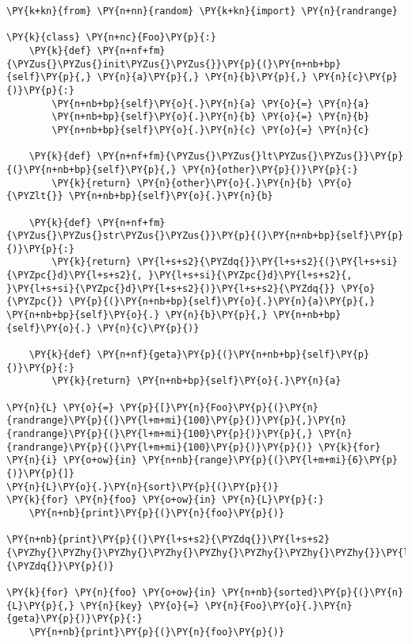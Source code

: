 \begin{Verbatim}[commandchars=\\\{\}]
\PY{k+kn}{from} \PY{n+nn}{random} \PY{k+kn}{import} \PY{n}{randrange}

\PY{k}{class} \PY{n+nc}{Foo}\PY{p}{:}
    \PY{k}{def} \PY{n+nf+fm}{\PYZus{}\PYZus{}init\PYZus{}\PYZus{}}\PY{p}{(}\PY{n+nb+bp}{self}\PY{p}{,} \PY{n}{a}\PY{p}{,} \PY{n}{b}\PY{p}{,} \PY{n}{c}\PY{p}{)}\PY{p}{:}
        \PY{n+nb+bp}{self}\PY{o}{.}\PY{n}{a} \PY{o}{=} \PY{n}{a}
        \PY{n+nb+bp}{self}\PY{o}{.}\PY{n}{b} \PY{o}{=} \PY{n}{b}
        \PY{n+nb+bp}{self}\PY{o}{.}\PY{n}{c} \PY{o}{=} \PY{n}{c}

    \PY{k}{def} \PY{n+nf+fm}{\PYZus{}\PYZus{}lt\PYZus{}\PYZus{}}\PY{p}{(}\PY{n+nb+bp}{self}\PY{p}{,} \PY{n}{other}\PY{p}{)}\PY{p}{:}
        \PY{k}{return} \PY{n}{other}\PY{o}{.}\PY{n}{b} \PY{o}{\PYZlt{}} \PY{n+nb+bp}{self}\PY{o}{.}\PY{n}{b}

    \PY{k}{def} \PY{n+nf+fm}{\PYZus{}\PYZus{}str\PYZus{}\PYZus{}}\PY{p}{(}\PY{n+nb+bp}{self}\PY{p}{)}\PY{p}{:}
        \PY{k}{return} \PY{l+s+s2}{\PYZdq{}}\PY{l+s+s2}{(}\PY{l+s+si}{\PYZpc{}d}\PY{l+s+s2}{, }\PY{l+s+si}{\PYZpc{}d}\PY{l+s+s2}{, }\PY{l+s+si}{\PYZpc{}d}\PY{l+s+s2}{)}\PY{l+s+s2}{\PYZdq{}} \PY{o}{\PYZpc{}} \PY{p}{(}\PY{n+nb+bp}{self}\PY{o}{.}\PY{n}{a}\PY{p}{,} \PY{n+nb+bp}{self}\PY{o}{.} \PY{n}{b}\PY{p}{,} \PY{n+nb+bp}{self}\PY{o}{.} \PY{n}{c}\PY{p}{)}

    \PY{k}{def} \PY{n+nf}{geta}\PY{p}{(}\PY{n+nb+bp}{self}\PY{p}{)}\PY{p}{:}
        \PY{k}{return} \PY{n+nb+bp}{self}\PY{o}{.}\PY{n}{a}

\PY{n}{L} \PY{o}{=} \PY{p}{[}\PY{n}{Foo}\PY{p}{(}\PY{n}{randrange}\PY{p}{(}\PY{l+m+mi}{100}\PY{p}{)}\PY{p}{,}\PY{n}{randrange}\PY{p}{(}\PY{l+m+mi}{100}\PY{p}{)}\PY{p}{,} \PY{n}{randrange}\PY{p}{(}\PY{l+m+mi}{100}\PY{p}{)}\PY{p}{)} \PY{k}{for} \PY{n}{i} \PY{o+ow}{in} \PY{n+nb}{range}\PY{p}{(}\PY{l+m+mi}{6}\PY{p}{)}\PY{p}{]}
\PY{n}{L}\PY{o}{.}\PY{n}{sort}\PY{p}{(}\PY{p}{)}
\PY{k}{for} \PY{n}{foo} \PY{o+ow}{in} \PY{n}{L}\PY{p}{:}
    \PY{n+nb}{print}\PY{p}{(}\PY{n}{foo}\PY{p}{)}

\PY{n+nb}{print}\PY{p}{(}\PY{l+s+s2}{\PYZdq{}}\PY{l+s+s2}{\PYZhy{}\PYZhy{}\PYZhy{}\PYZhy{}\PYZhy{}\PYZhy{}\PYZhy{}\PYZhy{}}\PY{l+s+s2}{\PYZdq{}}\PY{p}{)}

\PY{k}{for} \PY{n}{foo} \PY{o+ow}{in} \PY{n+nb}{sorted}\PY{p}{(}\PY{n}{L}\PY{p}{,} \PY{n}{key} \PY{o}{=} \PY{n}{Foo}\PY{o}{.}\PY{n}{geta}\PY{p}{)}\PY{p}{:}
    \PY{n+nb}{print}\PY{p}{(}\PY{n}{foo}\PY{p}{)}
\end{Verbatim}



